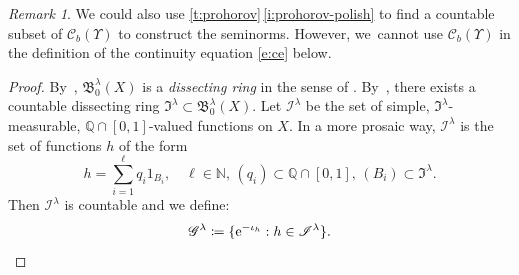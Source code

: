 \documentclass[JEP,XML,SOM,Unicode,published]{cedram}
\theoremstyle{definition}
\theoremstyle{remark}
\newtheorem{remark}[theorem]{Remark}
\DeclarePairedDelimiter{\set}{\lbrace}{\rbrace}
\begin{document}
\begin{remark}
We could also use \cref{t:prohorov}\,\cref{i:prohorov-polish} to find a countable subset of $\mathscr{C}_{b}(\varUpsilon)$ to construct the seminorms.
However, we~cannot use $\mathscr{C}_{b}(\varUpsilon)$ in the definition of the continuity equation \cref{e:ce} below.
\end{remark}

\begin{proof}
By~\cite[Lem.\,1.9(v)]{Kallenberg}, $\mathfrak{B}_{0}^{\lambda}(X)$ is a \emph{dissecting ring} in the sense of \cite[p.\,24]{Kallenberg}.
By~\cite[Lem.\,1.9(i)]{Kallenberg}, there exists a countable dissecting ring $\mathfrak{I}^{\lambda} \subset \mathfrak{B}_{0}^{\lambda}(X)$.
Let $\mathscr{I}^{\lambda}$ be the set of simple, $\mathfrak{I}^{\lambda}$-measurable, $\mathbb{Q} \cap [0,1]$-valued functions on $X$.
In a more prosaic way, $\mathscr{I}^{\lambda}$ is the set of functions $h$ of the form
\begin{equation*}
h = \sum_{i=1}^{\ell} q_{i} 1_{B_{i}}, \quad \ell \in \mathbb{N},\, (q_{i}) \subset \mathbb{Q} \cap [0,1],\, (B_{i}) \subset \mathfrak{I}^{\lambda}.
\end{equation*}
Then $\mathscr{I}^{\lambda}$ is countable and we define:
\begin{equation*}
\mathscr{G}^{\lambda} \coloneq \set{ \mathrm{e}^{-\iota_{h}} : h \in \mathscr{I}^{\lambda} }.
\end{equation*}


\end{proof}
\end{document}
